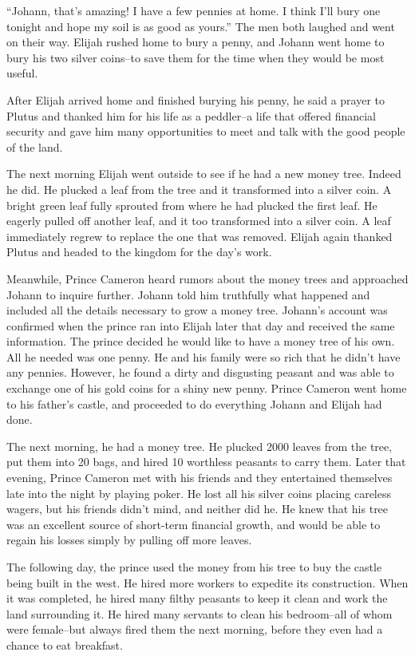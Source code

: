 “Johann, that's amazing! I have a few pennies at home. I think I'll bury one tonight and hope my soil is as good as yours.” The men both laughed and went on their way. Elijah rushed home to bury a penny, and Johann went home to bury his two silver coins--to save them for the time when they would be most useful.

After Elijah arrived home and finished burying his penny, he said a prayer to Plutus and thanked him for his life as a peddler--a life that offered financial security and gave him many opportunities to meet and talk with the good people of the land.

The next morning Elijah went outside to see if he had a new money tree. Indeed he did. He plucked a leaf from the tree and it transformed into a silver coin. A bright green leaf fully sprouted from where he had plucked the first leaf. He eagerly pulled off another leaf, and it too transformed into a silver coin. A leaf immediately regrew to replace the one that was removed. Elijah again thanked Plutus and headed to the kingdom for the day's work.

Meanwhile, Prince Cameron heard rumors about the money trees and approached Johann to inquire further. Johann told him truthfully what happened and included all the details necessary to grow a money tree. Johann's account was confirmed when the prince ran into Elijah later that day and received the same information. The prince decided he would like to have a money tree of his own. All he needed was one penny. He and his family were so rich that he didn't have any pennies. However, he found a dirty and disgusting peasant and was able to exchange one of his gold coins for a shiny new penny. Prince Cameron went home to his father's castle, and proceeded to do everything Johann and Elijah had done.

The next morning, he had a money tree. He plucked 2000 leaves from the tree, put them into  20 bags, and hired 10 worthless peasants to carry them. Later that evening, Prince Cameron met with his friends and they entertained themselves late into the night by playing poker. He lost all his silver coins placing careless wagers, but his friends didn't mind, and neither did he. He knew that his tree was an excellent source of short-term financial growth, and would be able to regain his losses simply by pulling off more leaves.

The following day, the prince used the money from his tree to buy the castle being built in the west. He hired more workers to expedite its construction. When it was completed, he hired many filthy peasants to keep it clean and work the land surrounding it. He hired many servants to clean his bedroom--all of whom were female--but always fired them the next morning, before they even had a chance to eat breakfast.

